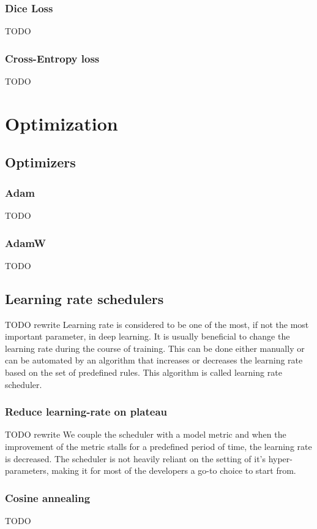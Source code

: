 \subsubsection{Dice Loss}
TODO

\subsubsection{Cross-Entropy loss}
TODO


\section{Optimization}
\subsection{Optimizers}
\subsubsection{Adam}
TODO
\subsubsection{AdamW}
TODO

\subsection{Learning rate schedulers}
TODO rewrite Learning rate is considered to be one of the most, if not the most important parameter, in deep learning. It is usually beneficial to change the learning rate during the course of training. This can be done either manually or can be automated by an algorithm that increases or decreases the learning rate based on the set of predefined rules. This algorithm is called learning rate scheduler.

\subsubsection{Reduce learning-rate on plateau}
TODO rewrite We couple the scheduler with a model metric and when the improvement of the metric stalls for a predefined period of time, the learning rate is decreased.
The scheduler is not heavily reliant on the setting of it's hyper-parameters, making it for most of the developers a go-to choice to start from.
\subsubsection{Cosine annealing}
TODO

